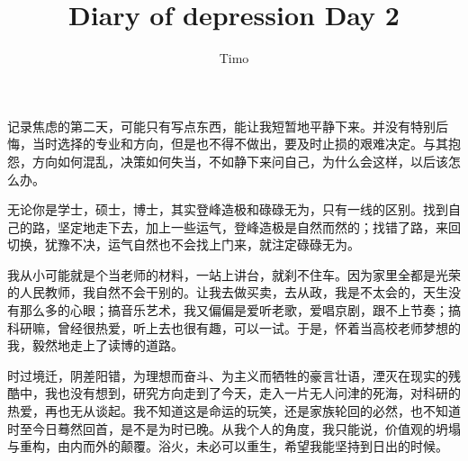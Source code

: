 \documentclass[11pt]{ctexart}
\title{Diary of depression Day 2}
\author{Timo}
\begin{document}
\maketitle

记录焦虑的第二天，可能只有写点东西，能让我短暂地平静下来。并没有特别后悔，当时选择的专业和方向，但是也不得不做出，要及时止损的艰难决定。与其抱怨，方向如何混乱，决策如何失当，不如静下来问自己，为什么会这样，以后该怎么办。\par
无论你是学士，硕士，博士，其实登峰造极和碌碌无为，只有一线的区别。找到自己的路，坚定地走下去，加上一些运气，登峰造极是自然而然的；找错了路，来回切换，犹豫不决，运气自然也不会找上门来，就注定碌碌无为。\par
我从小可能就是个当老师的材料，一站上讲台，就刹不住车。因为家里全都是光荣的人民教师，我自然不会干别的。让我去做买卖，去从政，我是不太会的，天生没有那么多的心眼；搞音乐艺术，我又偏偏是爱听老歌，爱唱京剧，跟不上节奏；搞科研嘛，曾经很热爱，听上去也很有趣，可以一试。于是，怀着当高校老师梦想的我，毅然地走上了读博的道路。\par
时过境迁，阴差阳错，为理想而奋斗、为主义而牺牲的豪言壮语，湮灭在现实的残酷中，我也没有想到，研究方向走到了今天，走入一片无人问津的死海，对科研的热爱，再也无从谈起。我不知道这是命运的玩笑，还是家族轮回的必然，也不知道时至今日蓦然回首，是不是为时已晚。从我个人的角度，我只能说，价值观的坍塌与重构，由内而外的颠覆。浴火，未必可以重生，希望我能坚持到日出的时候。\par
\end{document}
